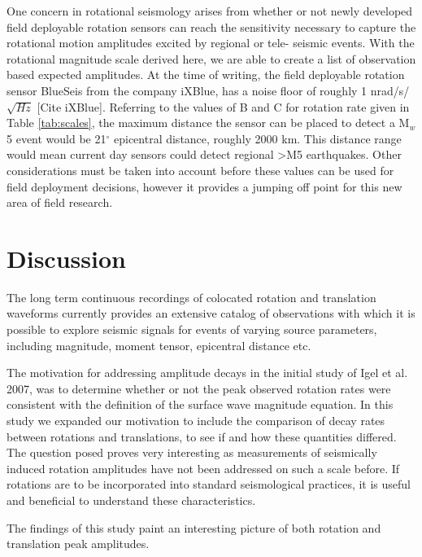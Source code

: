 \documentclass{gji}
\begin{document}
One concern in rotational seismology arises from whether or not newly developed field deployable rotation sensors can reach the sensitivity necessary to capture the rotational motion amplitudes excited by regional or tele- seismic events. With the rotational magnitude scale derived here, we are able to create a list of observation based expected amplitudes. At the time of writing, the field deployable rotation sensor BlueSeis from the company iXBlue, has a noise floor of roughly 1 nrad/s/$\sqrt{Hz}$ [Cite iXBlue]. Referring to the values of B and C for rotation rate given in Table \ref{tab:scales}, the maximum distance the sensor can be placed to detect a M$_w$5 event would be 21$^\circ$ epicentral distance, roughly 2000 km. This distance range would mean current day sensors could detect regional >M5 earthquakes. Other considerations must be taken into account before these values can be used for field deployment decisions, however it provides a jumping off point for this new area of field research.


\section{Discussion}
The long term continuous recordings of colocated rotation and translation waveforms currently provides an extensive catalog of observations with which it is possible to explore seismic signals for events of varying source parameters, including magnitude, moment tensor, epicentral distance etc. 

The motivation for addressing amplitude decays in the initial study of Igel et al. 2007, was to determine whether or not the peak observed rotation rates were consistent with the definition of the surface wave magnitude equation. In this study we expanded our motivation to include the comparison of decay rates between rotations and translations, to see if and how these quantities differed. The question posed proves very interesting as measurements of seismically induced rotation amplitudes have not been addressed on such a scale before. If rotations are to be incorporated into standard seismological practices, it is useful and beneficial to understand these characteristics.

The findings of this study paint an interesting picture of both rotation and translation peak amplitudes.
\end{document}
